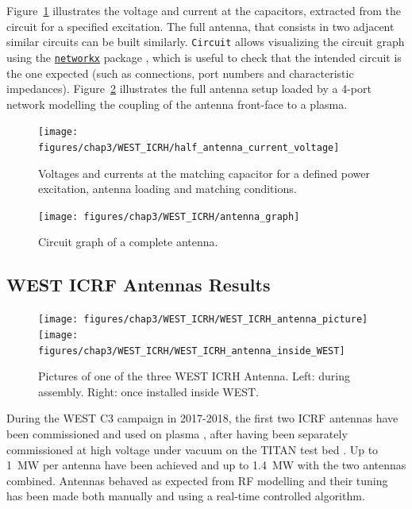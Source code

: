 {Figure~\ref{fig:halfantennacurrentvoltage} illustrates the voltage and current at the capacitors, extracted from the circuit for a specified excitation. The full antenna, that consists in two adjacent similar circuits can be built similarly. \texttt{Circuit} allows visualizing the circuit graph using the \href{https://networkx.github.io/}{\texttt{networkx}} package , which is useful to check that the intended circuit is the one expected (such as connections, port numbers and characteristic impedances). Figure~\ref{fig:antenna_graph} illustrates the full antenna setup loaded by a 4-port network modelling the coupling of the antenna front-face to a plasma.

\begin{figure}
	\centering
	\texttt{[image: figures/chap3/WEST\_ICRH/half\_antenna\_current\_voltage]}
	\caption{Voltages and currents at the matching capacitor for a defined power excitation, antenna loading and matching conditions.}
	\label{fig:halfantennacurrentvoltage}
\end{figure}

\begin{figure}
	\centering
	\texttt{[image: figures/chap3/WEST\_ICRH/antenna\_graph]}
	\caption{Circuit graph of a complete antenna.}
	\label{fig:antenna_graph}
\end{figure}



\subsection{WEST ICRF Antennas Results}

\begin{figure}
	\centering
	\texttt{[image: figures/chap3/WEST\_ICRH/WEST\_ICRH\_antenna\_picture]}	\texttt{[image: figures/chap3/WEST\_ICRH/WEST\_ICRH\_antenna\_inside\_WEST]}
	\caption{Pictures of one of the three WEST ICRH Antenna. Left: during assembly. Right: once installed inside WEST.}
	\label{fig:westicrhantennapicture}
\end{figure}

During the WEST C3 campaign in 2017-2018, the first two ICRF antennas have been commissioned and used on plasma , after having been separately commissioned at high voltage under vacuum on the TITAN test bed . Up to 1~MW per antenna have been achieved and up to 1.4~MW with the two antennas combined. Antennas behaved as expected from RF modelling and their tuning has been made both manually and using a real-time controlled algorithm. 

}

